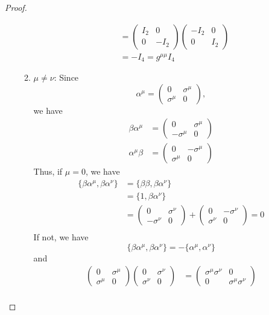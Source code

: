 \begin{proof}
\begin{enumerate}[label=(\alph*)]
\begin{enumerate}[label=(\arabic*)]
\begin{align*}
		       &=\begin{pmatrix} I_2 & 0 \\ 0 & -I_2 \end{pmatrix} \begin{pmatrix} -I_2 & 0 \\ 0 & I_2 \end{pmatrix}   \\
		       &= -I_4 = g^{\mu\mu}I_4
	\end{align*}
\item $\mu\neq\nu$:
	Since
	\[\alpha^\mu=\begin{pmatrix} 0 & \sigma^\mu \\ \sigma^\mu & 0 \end{pmatrix} ,\]
	we have
	\begin{align*}
		\beta\alpha^\mu &= \begin{pmatrix} 0 & \sigma^\mu \\ -\sigma^\mu & 0 \end{pmatrix} \\
		\alpha^\mu\beta &= \begin{pmatrix} 0 & -\sigma^\mu \\ \sigma^\mu & 0 \end{pmatrix} 
	\end{align*}
	Thus, if $\mu=0$, we have
	\begin{align*}
		\{\beta\alpha^\mu, \beta\alpha^\nu\} &= \{\beta\beta, \beta\alpha^\nu\} \\
						     &= \{1, \beta\alpha^\nu\} \\
						     &= \begin{pmatrix} 0 & \sigma^\nu \\ -\sigma^\nu & 0 \end{pmatrix} + \begin{pmatrix} 0 & -\sigma^\nu \\ \sigma^\nu & 0 \end{pmatrix} =0 \\
	\end{align*}
	If not, we have
	\[
		\{\beta\alpha^\mu, \beta\alpha^\nu\} = -\{\alpha^\mu, \alpha^\nu\} 
	\]
	and
	\begin{align*}
		\begin{pmatrix} 0 & \sigma^\mu \\ \sigma^\mu & 0 \end{pmatrix} \begin{pmatrix} 0 & \sigma^\nu \\ \sigma^\nu & 0 \end{pmatrix} &= \begin{pmatrix} \sigma^\mu\sigma^\nu & 0 \\ 0 & \sigma^\mu\sigma^\nu \end{pmatrix}  \\

\end{align*}
\end{enumerate}
\end{enumerate}
\end{proof}
